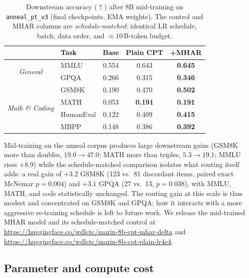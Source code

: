 \documentclass{article}
\begin{document}
\begin{table}[h]
\centering
\caption{Downstream accuracy ($\uparrow$) after 8B mid-training on
\texttt{anneal\_pt\_v3} (final checkpoints, EMA weights). The control and MHAR
columns are \emph{schedule-matched}: identical LR schedule, batch, data order,
and $\approx 10$\,B-token budget.}
\label{tab:midtrain}
\begin{tabular}{clccc}
\toprule
& \textbf{Task} & \textbf{Base} & \textbf{Plain CPT} & \textbf{+MHAR} \\
\midrule
\multirow{2}{*}{\emph{General}}
& MMLU          & 0.554 & 0.643 & \textbf{0.645} \\
& GPQA          & 0.266 & 0.315 & \textbf{0.346} \\
\midrule
\multirow{4}{*}{\emph{Math \& Coding}}
& GSM8K         & 0.190 & 0.470 & \textbf{0.502} \\
& MATH          & 0.053 & \textbf{0.191} & \textbf{0.191} \\
& HumanEval     & 0.122 & 0.409 & \textbf{0.415} \\
& MBPP          & 0.148 & 0.386 & \textbf{0.392} \\
\bottomrule
\end{tabular}
\end{table}

Mid-training on the anneal corpus produces large downstream gains (GSM8K more
than doubles, $19.0\rightarrow47.0$; MATH more than triples,
$5.3\rightarrow19.1$; MMLU rises $+8.9$) while the schedule-matched comparison
isolates what routing itself adds: a real gain of $+3.2$ GSM8K
(123 vs.\ 81 discordant items, paired exact McNemar $p{=}0.004$) and $+3.1$
GPQA (27 vs.\ 13, $p{=}0.038$), with MMLU, MATH, and code statistically
unchanged. The routing gain at this scale is thus modest and concentrated on
GSM8K and GPQA; how it interacts with a more aggressive re-training schedule
is left to future work. We release the mid-trained MHAR model and its
schedule-matched control at
\url{https://huggingface.co/wdlctc/marin-8b-cpt-mhar-delta} and
\url{https://huggingface.co/wdlctc/marin-8b-cpt-plain-lr4e4}.

\subsection{Parameter and compute cost}
\end{document}
